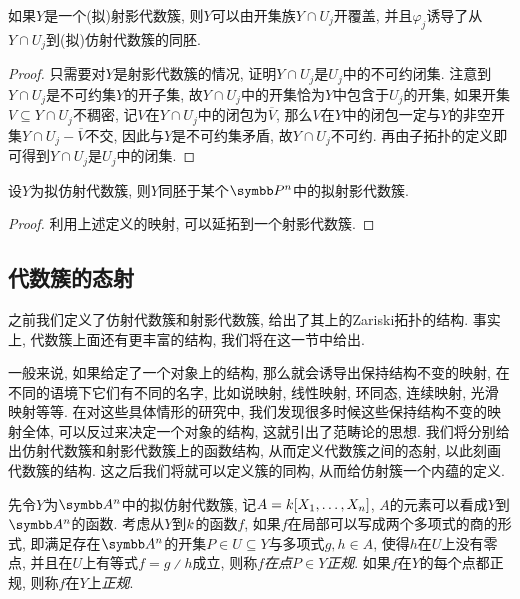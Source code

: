 \begin{proposition}\label{prop:projvarietyopencoverhomeo}
    如果$Y$是一个(拟)射影代数簇, 则$Y$可以由开集族$Y\cap U_j$开覆盖, 并且$\varphi_j$诱导了从$Y\cap U_j$到(拟)仿射代数簇的同胚.
\end{proposition}

\begin{proof}
    只需要对$Y$是射影代数簇的情况, 证明$Y\cap U_j$是$U_j$中的不可约闭集. 注意到$Y\cap U_j$是不可约集$Y$的开子集, 故$Y\cap U_j$中的开集恰为$Y$中包含于$U_j$的开集\parencite[89, Lemma 16.2]{munkres_topology_2000}, 如果开集$V\subseteq Y\cap U_j$不稠密, 记$V$在$Y\cap U_j$中的闭包为$\overline{V}$, 那么$V$在$Y$中的闭包一定与$Y$的非空开集$Y\cap U_j-\overline{V}$不交\parencite[95, Theorem 17.5]{munkres_topology_2000}, 因此与$Y$是不可约集矛盾, 故$Y\cap U_j$不可约. 再由子拓扑的定义即可得到$Y\cap U_j$是$U_j$中的闭集.
\end{proof}

\begin{proposition}
    设$Y$为拟仿射代数簇, 则$Y$同胚于某个$\PP^n$中的拟射影代数簇.
\end{proposition}

\begin{proof}
    利用上述定义的映射, 可以延拓到一个射影代数簇.%
\end{proof}

\subsection{代数簇的态射}

之前我们定义了仿射代数簇和射影代数簇, 给出了其上的Zariski拓扑的结构. 事实上, 代数簇上面还有更丰富的结构, 我们将在这一节中给出.

一般来说, 如果给定了一个对象上的结构, 那么就会诱导出保持结构不变的映射, 在不同的语境下它们有不同的名字, 比如说映射, 线性映射, 环同态, 连续映射, 光滑映射等等. 在对这些具体情形的研究中, 我们发现很多时候这些保持结构不变的映射全体, 可以反过来决定一个对象的结构, 这就引出了范畴论的思想. 我们将分别给出仿射代数簇和射影代数簇上的函数结构, 从而定义代数簇之间的态射, 以此刻画代数簇的结构. 这之后我们将就可以定义簇的同构, 从而给仿射簇一个内蕴的定义.

先令$Y$为$\AF^n$中的拟仿射代数簇, 记$A=k [X_1, \dotsc, X_n]$, $A$的元素可以看成$Y$到$\AF^n$的函数. 考虑从$Y$到$k$的函数$f$, 如果$f$在局部可以写成两个多项式的商的形式, 即满足存在$\AF^n$的开集$P\in U\subseteq Y$与多项式$g, h\in A$, 使得$h$在$U$上没有零点, 并且在$U$上有等式$f=g{\divslash}h$成立, 则称$f$\emph{在点$P\in Y$正规}. 如果$f$在$Y$的每个点都正规, 则称$f$在$Y$上\emph{正规}.

